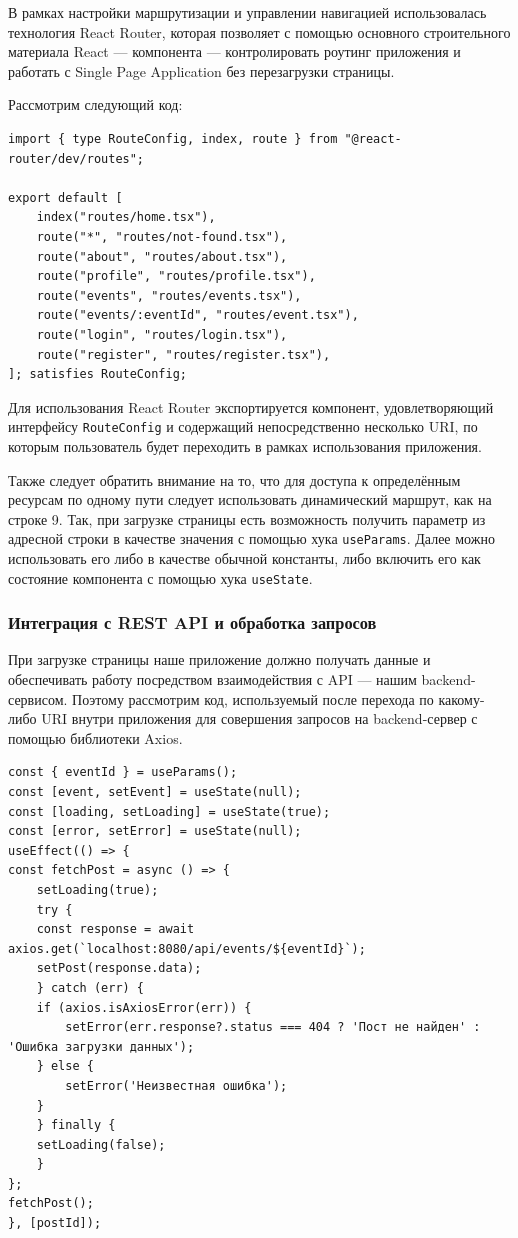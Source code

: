 \documentclass[diploma]{SCWorks}
\begin{document}
В рамках настройки маршрутизации и управлении навигацией использовалась 
технология React Router, которая позволяет с помощью основного строительного
материала React — компонента — контролировать роутинг приложения и работать
с Single Page Application без перезагрузки страницы.

Рассмотрим следующий код:
\begin{verbatim}
import { type RouteConfig, index, route } from "@react-router/dev/routes";

export default [
    index("routes/home.tsx"),
    route("*", "routes/not-found.tsx"),
    route("about", "routes/about.tsx"),
    route("profile", "routes/profile.tsx"),
    route("events", "routes/events.tsx"),
    route("events/:eventId", "routes/event.tsx"),
    route("login", "routes/login.tsx"),
    route("register", "routes/register.tsx"),
]; satisfies RouteConfig;
\end{verbatim}
Для использования React Router экспортируется компонент, удовлетворяющий
интерфейсу \texttt{RouteConfig} и содержащий непосредственно несколько URI, 
по которым пользователь будет переходить в рамках использования приложения.

Также следует обратить внимание на то, что для доступа к определённым ресурсам
по одному пути следует использовать динамический маршрут, как на строке 9. Так,
при загрузке страницы есть возможность получить параметр из адресной строки в качестве
значения с помощью хука \texttt{useParams}. Далее можно использовать его 
либо в качестве обычной константы, либо включить его как состояние компонента
с помощью хука \texttt{useState}.

\subsubsection{Интеграция с REST API и обработка запросов}

При загрузке страницы наше приложение должно получать данные и обеспечивать 
работу посредством взаимодействия с API ­— нашим backend-сервисом. Поэтому
рассмотрим код, используемый после перехода по какому-либо URI внутри 
приложения для совершения запросов на backend-сервер с помощью библиотеки 
Axios. 

\begin{verbatim}
const { eventId } = useParams();
const [event, setEvent] = useState(null);
const [loading, setLoading] = useState(true);
const [error, setError] = useState(null);
useEffect(() => {
const fetchPost = async () => {
    setLoading(true);
    try {
    const response = await axios.get(`localhost:8080/api/events/${eventId}`);
    setPost(response.data);
    } catch (err) {
    if (axios.isAxiosError(err)) {
        setError(err.response?.status === 404 ? 'Пост не найден' : 'Ошибка загрузки данных');
    } else {
        setError('Неизвестная ошибка');
    }
    } finally {
    setLoading(false);
    }
};
fetchPost();
}, [postId]);
\end{verbatim}
\end{document}
